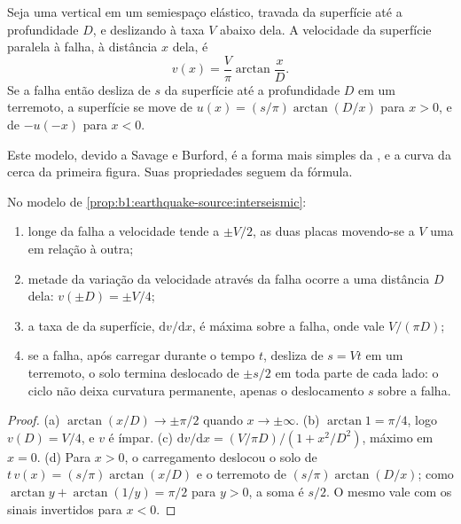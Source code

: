 \begin{proposition}\label{prop:b1:earthquake-source:interseismic}
Seja uma  vertical em um semiespaço elástico, travada da superfície até a profundidade $D$, e deslizando à taxa $V$ abaixo dela. A velocidade da superfície paralela à falha, à distância $x$ dela, é
\[
  v(x) = \frac{V}{\pi}\arctan\frac{x}{D} .
\]
Se a falha então desliza de $s$ da superfície até a profundidade $D$ em um terremoto, a superfície se move de $u(x) = (s/\pi)\arctan(D/x)$ para $x > 0$, e de
$-u(-x)$ para $x < 0$.
\end{proposition}
\admitted

Este modelo, devido a Savage e Burford, é a forma mais simples da , e a curva da cerca da primeira figura. Suas propriedades seguem da fórmula.

\begin{proposition}\label{prop:b1:earthquake-source:profile}
No modelo de \cref{prop:b1:earthquake-source:interseismic}:
\begin{enumerate}[label=(\alph*)]
  \item longe da falha a velocidade tende a $\pm V/2$, as duas placas movendo-se a $V$ uma em relação à outra;
  \item metade da variação da velocidade através da falha ocorre a uma distância $D$ dela: $v(\pm D) = \pm V/4$;
  \item a taxa de  da superfície, $\mathrm dv/\mathrm dx$, é máxima sobre a falha, onde vale $V/(\pi D)$;
  \item se a falha, após carregar durante o tempo $t$, desliza de $s = Vt$ em um terremoto, o solo termina deslocado de $\pm s/2$ em toda parte de cada lado: o ciclo não deixa curvatura permanente, apenas o deslocamento $s$ sobre a falha.
\end{enumerate}
\end{proposition}

\begin{proof}
(a) $\arctan(x/D) \to \pm\pi/2$ quando $x \to \pm\infty$. (b) $\arctan 1 = \pi/4$, logo $v(D) = V/4$, e $v$ é ímpar. (c) $\mathrm dv/\mathrm dx = (V/\pi D)/(1 +
x^2/D^2)$, máximo em $x = 0$. (d) Para $x > 0$, o carregamento deslocou o solo de $t\,v(x) = (s/\pi)\arctan(x/D)$ e o terremoto de $(s/\pi)\arctan(D/x)$; como $\arctan y + \arctan(1/y) = \pi/2$ para $y > 0$, a soma é $s/2$. O mesmo vale com os sinais invertidos para $x < 0$.
\end{proof}

